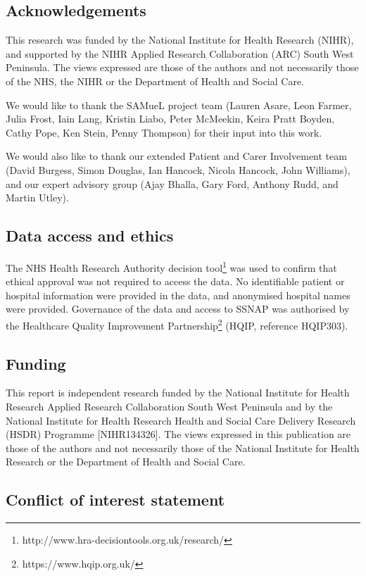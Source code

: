 \subsection*{Acknowledgements}

This research was funded by the National Institute for Health Research (NIHR), and supported by the NIHR Applied Research Collaboration (ARC) South West Peninsula. The views expressed are those of the authors and not necessarily those of the NHS, the NIHR or the Department of Health and Social Care.

We would like to thank the SAMueL project team (Lauren Asare, Leon Farmer, Julia Frost,  Iain Lang, Kristin Liabo, Peter McMeekin, Keira Pratt Boyden, Cathy Pope, Ken Stein, Penny Thompson) for their input into this work.

We would also like to thank our extended Patient and Carer Involvement team (David Burgess, Simon Douglas, Ian Hancock, Nicola Hancock, John Williams), and our expert advisory group (Ajay Bhalla, Gary Ford, Anthony Rudd, and Martin Utley).

\subsection{Data access and ethics}

The NHS Health Research Authority decision tool\footnote{http://www.hra-decisiontools.org.uk/research/} was used to confirm that ethical approval was not required to access the data. No identifiable patient or hospital information were provided in the data, and anonymised hospital names were provided. Governance of the data and access to SSNAP was authorised by the Healthcare Quality Improvement Partnership\footnote{https://www.hqip.org.uk/} (HQIP, reference HQIP303). 

\subsection*{Funding}

This report is independent research funded by the National Institute for Health Research Applied Research Collaboration South West Peninsula and by the National Institute for Health Research Health and Social Care Delivery Research (HSDR) Programme [NIHR134326]. The views expressed in this publication are those of the authors and not necessarily those of the National Institute for Health Research or the Department of Health and Social Care.

\subsection*{Conflict of interest statement}

